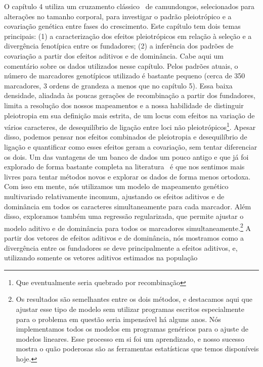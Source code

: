 \begin{refsection}
O capítulo 4 utiliza um cruzamento clássico~\parencite[descrito
em][]{Cheverud1996-fm} de camundongos, selecionados para alterações no tamanho
corporal, para investigar o padrão pleiotrópico e a covariação genética entre
fases do crescimento. Este capítulo tem dois temas principais: (1) a
caracterização dos efeitos pleiotrópicos em relação à seleção e a divergência
fenotípica entre os fundadores; (2) a inferência dos padrões de covariação a
partir dos efeitos aditivos e de dominância. Cabe aqui um comentário sobre os
dados utilizados nesse capítulo. Pelos padrões atuais, o número de marcadores
genotípicos utilizado é bastante pequeno (cerca de 350 marcadores, 3 ordens de
grandeza a menos que no capítulo 5). Essa baixa densidade, aliadada às poucas
gerações de recombinação a partir dos fundadores, limita a resolução dos
nossos mapeamentos e a nossa habilidade de distinguir pleiotropia em sua
definição mais estrita, de um locus com efeitos na variação de vários
caracteres, de desequilíbrio de ligação entre loci não
pleiotrópicos\footnote{Que eventualmente seria quebrado por recombinação}.
Apesar disso, podemos pensar nos efeitos combinados de pleiotropia e
desequilíbrio de ligação e quantificar como esses efeitos geram a covariação,
sem tentar diferenciar os dois. Um das vantagens de um banco de dados um pouco
antigo e que já foi explorado de forma bastante completa na
literatura~\parencite{Cheverud1996-fm, Kramer1998-cc, Hager2009-mz,
Vaughn1999-wt, Leamy2002-nh, Wolf2005-nr, Mitteroecker2016-vq} é que nos
sentimos mais livres para tentar métodos novos e explorar os dados de forma
menos ortodoxa. Com isso em mente, nós utilizamos um modelo de mapeamento
genético multivariado relativamente incomum, ajustando os efeitos aditivos e
de dominância em todos os caracteres simultaneamente para cada marcador. Além
disso, exploramos também uma regressão regularizada, que permite ajustar o
modelo aditivo e de dominância para todos os marcadores
simultaneamente.\footnote{Os resultados são semelhantes entre os dois métodos,
e destacamos aqui que ajustar esse tipo de modelo sem utilizar programas
escritos especialmente para o problema em questão seria impensável há alguns
anos. Nós implementamos todos os modelos em programas genéricos para o ajuste
de modelos lineares. Esse processo em si foi um aprendizado, e nosso sucesso
mostra o quão poderosas são as ferramentas estatísticas que temos disponíveis
hoje.} A partir dos vetores de efeitos aditivos e de dominância, nós mostramos
como a divergência entre os fundadores se deve principalmente a efeitos
aditivos, e, utilizando somente os vetores aditivos estimados na população

\end{refsection}
